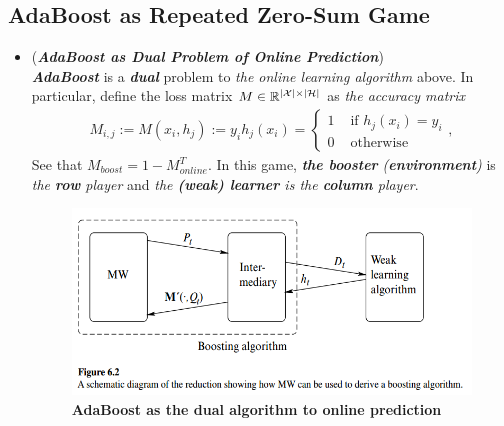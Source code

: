 \documentclass[11pt]{article}
\begin{document}
\subsection{AdaBoost as Repeated Zero-Sum Game}
\begin{itemize}
\item \begin{remark}[Algorithm](\textbf{\emph{AdaBoost as Dual Problem of Online Prediction}}) \citep{schapire2012boosting, mohri2018foundations} \\
\emph{\textbf{AdaBoost}} is a \emph{\textbf{dual}} problem to \emph{the online learning algorithm} above. In particular, define the loss matrix $M \in {\mathbb R}^{\left\lvert {\mathcal X} \right\rvert \times \left\lvert {\mathcal H} \right\rvert}$ as \emph{the accuracy matrix}
\begin{align*}
M_{i,j} := M(x_i, h_j) :=  y_i h_j(x_i) = \left\{ \begin{array}{cc}
1 &\text{ if }h_j(x_i) = y_i \\
0 &\text{ otherwise}
\end{array}
\right. ,
\end{align*} See that $M_{boost} = 1 - M_{online}^{T}$. In this game, \emph{\textbf{the booster} (\textbf{environment})} is \emph{the \textbf{row} player} and \emph{the \textbf{(weak) learner} is the \textbf{column} player}. 

\begin{figure}
\begin{minipage}[h!]{1\linewidth}
  \centering
  \centerline{\includegraphics[scale = 0.5]{online_learning_boost_2.png}}
\end{minipage}
\caption{\footnotesize{\textbf{AdaBoost as the dual algorithm to online prediction \citep{schapire2012boosting}}}}
\label{fig: online_learning_boost_2}
\end{figure}


\end{remark}
\end{itemize}
\end{document}
